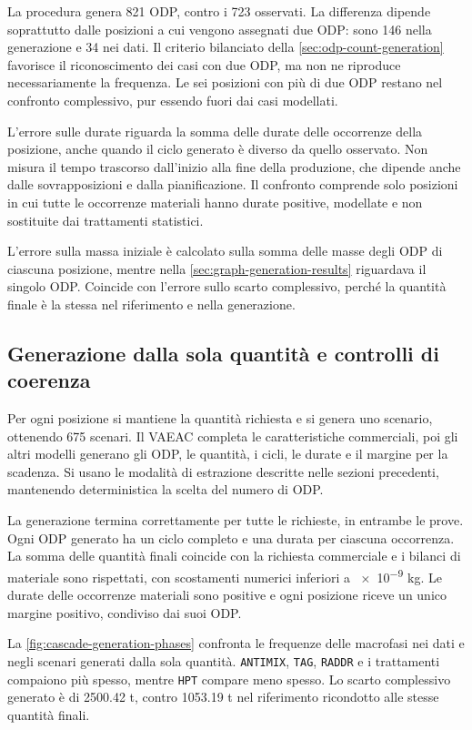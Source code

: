 La procedura genera 821 ODP, contro i 723 osservati. La differenza dipende soprattutto dalle posizioni a cui vengono assegnati due ODP: sono 146 nella generazione e 34 nei dati. Il criterio bilanciato della \cref{sec:odp-count-generation} favorisce il riconoscimento dei casi con due ODP, ma non ne riproduce necessariamente la frequenza. Le sei posizioni con più di due ODP restano nel confronto complessivo, pur essendo fuori dai casi modellati.

L'errore sulle durate riguarda la somma delle durate delle occorrenze della posizione, anche quando il ciclo generato è diverso da quello osservato. Non misura il tempo trascorso dall'inizio alla fine della produzione, che dipende anche dalle sovrapposizioni e dalla pianificazione. Il confronto comprende solo posizioni in cui tutte le occorrenze materiali hanno durate positive, modellate e non sostituite dai trattamenti statistici.

L'errore sulla massa iniziale è calcolato sulla somma delle masse degli ODP di ciascuna posizione, mentre nella \cref{sec:graph-generation-results} riguardava il singolo ODP. Coincide con l'errore sullo scarto complessivo, perché la quantità finale è la stessa nel riferimento e nella generazione.

\subsection{Generazione dalla sola quantità e controlli di coerenza}
\label{sec:cascade-quantity-only}

Per ogni posizione si mantiene la quantità richiesta e si genera uno scenario, ottenendo 675 scenari. Il VAEAC completa le caratteristiche commerciali, poi gli altri modelli generano gli ODP, le quantità, i cicli, le durate e il margine per la scadenza. Si usano le modalità di estrazione descritte nelle sezioni precedenti, mantenendo deterministica la scelta del numero di ODP.

La generazione termina correttamente per tutte le richieste, in entrambe le prove. Ogni ODP generato ha un ciclo completo e una durata per ciascuna occorrenza. La somma delle quantità finali coincide con la richiesta commerciale e i bilanci di materiale sono rispettati, con scostamenti numerici inferiori a \num{e-9} kg. Le durate delle occorrenze materiali sono positive e ogni posizione riceve un unico margine positivo, condiviso dai suoi ODP.

La \cref{fig:cascade-generation-phases} confronta le frequenze delle macrofasi nei dati e negli scenari generati dalla sola quantità. \texttt{ANTIMIX}, \texttt{TAG}, \texttt{RADDR} e i trattamenti compaiono più spesso, mentre \texttt{HPT} compare meno spesso. Lo scarto complessivo generato è di \num{2500.42} t, contro \num{1053.19} t nel riferimento ricondotto alle stesse quantità finali.

